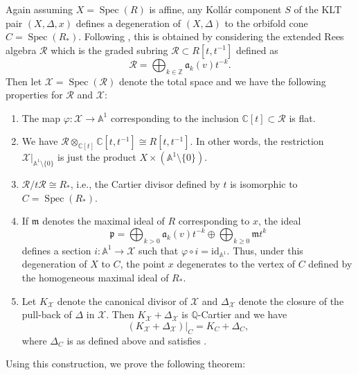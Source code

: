 \documentclass[11pt,reqno]{amsart}
\newcommand{\A}{\mathbb{A}}
\newcommand{\C}{\mathbb{C}}
\newcommand{\Q}{\mathbb{Q}}
\newcommand{\Z}{\mathbb{Z}}
\newcommand{\cR}{\mathcal{R}}
\newcommand{\cX}{\mathcal{X}}
\newcommand{\fa}{\mathfrak{a}}
\newcommand{\fm}{\mathfrak{m}}
\newcommand{\isom}{\cong}
\DeclareMathOperator{\Spec}{Spec}
\numberwithin{equation}{section}
\theoremstyle{definition}
\begin{document}
Again assuming $X = \Spec(R)$ is affine, any Koll\'ar component $S$ of the KLT pair $(X, \Delta, x)$ defines a degeneration of $(X, \Delta)$ to the orbifold cone $C = \Spec(R_*)$. Following \cite[Section 4.1]{LiXuStabilityofvaluations}, this is obtained by considering the extended Rees algebra $\cR$ which is the graded subring $\cR \subset R[t, t^{-1}]$ defined as
\[  \cR = \bigoplus _{k \in \Z}  \fa_{k} (v) t^{-k}. \]
Then let $\cX = \Spec(\cR)$ denote the total space and we have the following properties for $\cR$ and $\cX$:
\begin{enumerate}
    \item The map $\varphi: \cX \to \A^1$ corresponding to the inclusion $\C[t] \subset \cR$ is flat.
    \item We have $\cR \otimes _{\C[t]} \C[t,t^{-1}] \isom R[t, t^{-1}]$. In other words, the restriction $\cX|_{\A^1 \setminus \{0\}}$ is just the product $X \times (\A^1 \setminus \{0\}) $.
    \item $\cR/t\cR \isom R_*$, i.e., the Cartier divisor defined by $t$ is isomorphic to $C = \Spec(R_*)$.
    \item If $\fm$ denotes the maximal ideal of $R$ corresponding to $x$, the ideal
    \[ \mathfrak{p} = \bigoplus_{k>0} \fa_k (v) t^{-k} \oplus \bigoplus _{k \geq 0} \fm t^{k} \] defines a section $i : \A^1 \to \cX$ such that $\varphi \circ i = \text{id}_{\A^1}$. Thus, under this degeneration of $X$ to $C$, the point $x$ degenerates to the vertex of $C$ defined by the homogeneous maximal ideal of $R_*$.
    \item Let $K_\cX$ denote the canonical divisor of $\cX$ and $\Delta_{\cX}$ denote the closure of the pull-back of $\Delta$ in $\cX$. Then $K_\cX + \Delta_\cX$ is $\Q$-Cartier and we have
    \[ (K_\cX + \Delta_\cX)|_{C} = K_C + \Delta_C, \]
    where $\Delta_C$ is as defined above and satisfies .
\end{enumerate}

Using this construction, we prove the following theorem:
\end{document}
